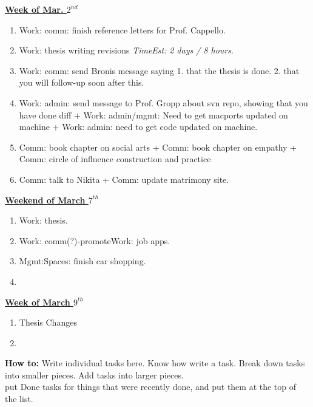 \documentclass[11pt]{article}
\newcommand{\te}[1]{\textit{TimeEst:} \textit{#1}}
\begin{document}
           {\small \underline{\textbf{Week of Mar. $2^{nd}$}} }\\
           \begin{enumerate} 
           \item \small Work: comm: finish reference letters for Prof. Cappello.  
           \item \small Work: thesis writing revisions \te {2 days / 8
             hours}. 
           \item \small Work: comm: send Bronis message saying
             1. that the thesis is done.  2. that you will follow-up
             soon after this.
           \item \small Work: admin: send message to Prof. Gropp about
             svn repo, showing that you have done diff   + Work:
             admin/mgmt: Need to get macports updated on machine +
             Work: admin: need to get code updated on machine. 

           \item \small Comm: book chapter on social arts + Comm: book
             chapter on empathy + Comm: circle of influence construction and
             practice 
             \item \small Comm: talk to Nikita + Comm: update
               matrimony site. 
           \end{enumerate}

           {\small \underline{\textbf{Weekend of March $7^{th}$}}}\\
           \begin{enumerate} 
           \small \item \small Work: thesis. 
           \item \small Work: comm(?)-promoteWork: job apps. 
           \item \small Mgmt:Spaces: finish car shopping.
           \item \small 
           \end{enumerate} 
         
           {\small \underline{\textbf{Week of March $9^{th}$}}}\\  
           \begin{enumerate} 
             \small \item \small Thesis Changes  
           \item \small 
             \end{enumerate} 
\newpage 
\textbf{How to:} Write individual tasks here. Know how write a task. 
Break down tasks into smaller pieces. Add tasks into larger
pieces. \\ put Done tasks for things that were recently done, and put
them at the top of the list.
\end{document}
